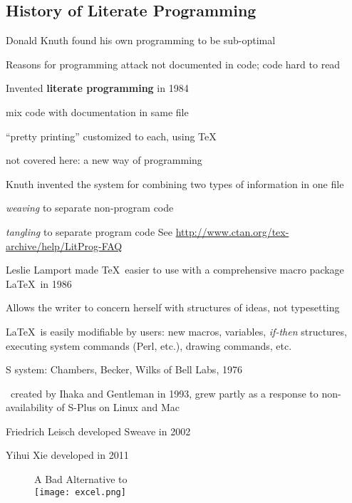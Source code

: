 \subsection{History of Literate Programming}
\bi
\item Donald Knuth found his own programming to be sub-optimal
\item Reasons for programming attack not documented in code; code hard to read
\item Invented \textbf{literate programming} in 1984
 \bi
 \item mix code with documentation in same file
 \item ``pretty printing'' customized to each, using \TeX
 \item not covered here: a new way of programming
 \ei
\item Knuth invented the  system for combining two types of
 information in one file
 \bi
 \item \emph{weaving} to separate non-program code
 \item \emph{tangling} to separate program code
 \ei
\ei
See \url{http://www.ctan.org/tex-archive/help/LitProg-FAQ}
\bi
\item Leslie Lamport made \TeX\ easier to use with a comprehensive
 macro package \LaTeX\ in 1986
\item Allows the writer to concern herself with structures of ideas,
not typesetting
\item \LaTeX\ is easily modifiable by users: new macros,
variables, \emph{if-then} structures, executing system commands (Perl,
etc.), drawing commands, etc.
\item S system: Chambers, Becker, Wilks of Bell Labs, 1976
\item \R\ created by Ihaka and Gentleman in 1993, grew partly as a response
 to non-availability of S-Plus on Linux and Mac
\item Friedrich Leisch developed Sweave in 2002
\item Yihui Xie developed  in 2011
\ei

\begin{figure}\begin{center}{\smaller[-2] A Bad Alternative to }\\%
\texttt{[image: excel.png]}
\end{center}\end{figure}

